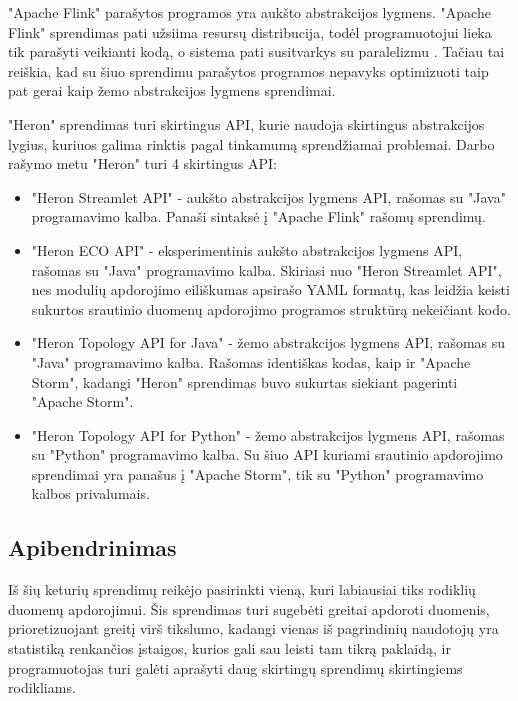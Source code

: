 \documentclass{VUMIFPSbakalaurinis}
\begin{document}
"Apache Flink" parašytos programos yra aukšto abstrakcijos lygmens. "Apache Flink" sprendimas pati užsiima resursų distribucija, todėl programuotojui lieka tik parašyti veikianti kodą, o sistema pati susitvarkys su paralelizmu \cite{flinkdoc}. Tačiau tai reiškia, kad su šiuo sprendimu parašytos programos nepavyks optimizuoti taip pat gerai kaip žemo abstrakcijos lygmens sprendimai. \par

"Heron" sprendimas turi skirtingus API, kurie naudoja skirtingus abstrakcijos lygius, kuriuos galima rinktis pagal tinkamumą sprendžiamai problemai. Darbo rašymo metu "Heron" turi 4 skirtingus API:
\begin{itemize}
    \item "Heron Streamlet API" - aukšto abstrakcijos lygmens API, rašomas su "Java" programavimo kalba. Panaši sintaksė į "Apache Flink" rašomų sprendimų.
    \item "Heron ECO API" - eksperimentinis aukšto abstrakcijos lygmens API, rašomas su "Java" programavimo kalba. Skiriasi nuo "Heron Streamlet API", nes modulių apdorojimo eiliškumas apsirašo YAML formatų, kas leidžia keisti sukurtos srautinio duomenų apdorojimo programos struktūrą nekeičiant kodo.
    \item "Heron Topology API for Java" - žemo abstrakcijos lygmens API, rašomas su "Java" programavimo kalba. Rašomas identiškas kodas, kaip ir "Apache Storm", kadangi "Heron" sprendimas buvo sukurtas siekiant pagerinti "Apache Storm".
    \item "Heron Topology API for Python" - žemo abstrakcijos lygmens API, rašomas su "Python" programavimo kalba. Su šiuo API kuriami srautinio apdorojimo sprendimai yra panašus į "Apache Storm", tik su "Python" programavimo kalbos privalumais.
\end{itemize}  


\subsection{Apibendrinimas}
Iš šių keturių sprendimų reikėjo pasirinkti vieną, kuri labiausiai tiks rodiklių duomenų apdorojimui. Šis sprendimas turi sugebėti greitai apdoroti duomenis, prioretizuojant greitį virš tikslumo, kadangi vienas iš pagrindinių naudotojų yra statistiką renkančios įstaigos, kurios gali sau leisti tam tikrą paklaidą, ir programuotojas turi galėti aprašyti daug skirtingų sprendimų skirtingiems rodikliams.\par
\end{document}
